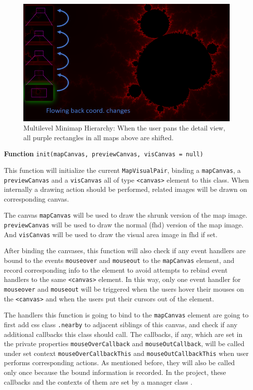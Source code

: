 \begin{figure}[th]
\centering
\includegraphics[width=\textwidth,keepaspectratio]{Figures/Chapter4/mvp-pairflow.png}
\decoRule
\caption[Multilevel Minimap Hierarchy]{Multilevel Minimap Hierarchy: When the user pans the detail view, all purple rectangles in all \glspl{map} above are shifted.}
\label{fig:mvp-pairflow}
\end{figure}

\textbf{Function} \verb|init(mapCanvas, previewCanvas, visCanvas = null)|

This function will initialize the current \texttt{MapVisualPair}, binding a \texttt{mapCanvas}, a \texttt{previewCanvas} and a \texttt{visCanvas} all of type \texttt{<canvas>} element to this class. When internally a drawing action should be performed, related images will be drawn on corresponding canvas.

The canvas \texttt{mapCanvas} will be used to draw the shrunk version of the \gls{map} image. \texttt{previewCanvas} will be used to draw the normal (\gls{fhd}) version of the \gls{map} image. And \texttt{visCanvas} will be used to draw the visual area image in \gls{fhd} if set.

After binding the canvases, this function will also check if any event handlers are bound to the events \texttt{mouseover} and \texttt{mouseout} to the \texttt{mapCanvas} element, and record corresponding info to the element to avoid attempts to rebind event handlers to the same \texttt{<canvas>} element. In this way, only one event handler for \texttt{mouseover} and \texttt{mouseout} will be triggered when the users hover their mouses on the \texttt{<canvas>} and when the users put their cursors out of the element.

The handlers this function is going to bind to the \texttt{mapCanvas} element are going to first add \gls{css} class \texttt{.nearby} to adjacent siblings of this canvas, and check if any additional callbacks this class should call. The callbacks, if any, which are set in the private properties \texttt{mouseOverCallback} and \texttt{mouseOutCallback}, will be called under set context \texttt{mouseOverCallbackThis} and \texttt{mouseOutCallbackThis} when user performs corresponding actions. As mentioned before, they will also be called only once because the bound information is recorded. In the project, these callbacks and the contexts of them are set by a manager class .

